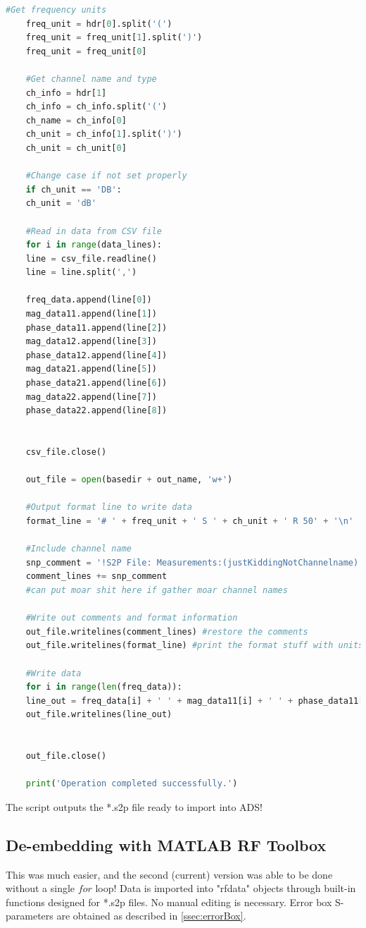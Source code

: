 \documentclass{article} %
\begin{document}
\begin{lstlisting}[language=Python, caption=Python Based *.csv to *.s2p Converter]
	#Get frequency units
	freq_unit = hdr[0].split('(')
	freq_unit = freq_unit[1].split(')')
	freq_unit = freq_unit[0]
	
	#Get channel name and type
	ch_info = hdr[1]
	ch_info = ch_info.split('(')
	ch_name = ch_info[0]
	ch_unit = ch_info[1].split(')')
	ch_unit = ch_unit[0]
	
	#Change case if not set properly
	if ch_unit == 'DB':
	ch_unit = 'dB'
	
	#Read in data from CSV file
	for i in range(data_lines):
	line = csv_file.readline()
	line = line.split(',')
	
	freq_data.append(line[0])
	mag_data11.append(line[1])
	phase_data11.append(line[2])
	mag_data12.append(line[3])
	phase_data12.append(line[4])
	mag_data21.append(line[5])
	phase_data21.append(line[6])
	mag_data22.append(line[7])
	phase_data22.append(line[8])
	
	
	csv_file.close()
	
	out_file = open(basedir + out_name, 'w+')
	
	#Output format line to write data
	format_line = '# ' + freq_unit + ' S ' + ch_unit + ' R 50' + '\n'
	
	#Include channel name
	snp_comment = '!S2P File: Measurements:(justKiddingNotChannelname) ' + ch_name + '\n'
	comment_lines += snp_comment
	#can put moar shit here if gather moar channel names
	
	#Write out comments and format information
	out_file.writelines(comment_lines) #restore the comments
	out_file.writelines(format_line) #print the format stuff with units/whatever
	
	#Write data
	for i in range(len(freq_data)):
	line_out = freq_data[i] + ' ' + mag_data11[i] + ' ' + phase_data11[i] + ' ' + mag_data12[i] + ' ' + phase_data12[i] + ' ' + mag_data21[i] + ' ' + phase_data21[i]+ ' ' + mag_data22[i] + ' ' + phase_data22[i]# + '\n'
	out_file.writelines(line_out)
	
	
	out_file.close()
	
	print('Operation completed successfully.')
	\end{lstlisting}
	
	The script outputs the *.s2p file ready to import into ADS!
	
	\subsection{De-embedding with MATLAB RF Toolbox}
	This was much easier, and the second (current) version was able to be done without a single $for$ loop!  Data is imported into "rfdata" objects through built-in functions designed for *.s2p files.  No manual editing is necessary.  Error box S-parameters are obtained as described in \autoref{ssec:errorBox}.
	
\end{document}
